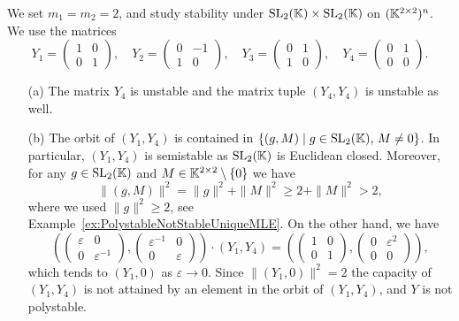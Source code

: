 \begin{example}
	We set $m_1=m_2=2$, and study stability under $\operatorname{SL}_2(\mathbb K) \times \operatorname{SL}_2(\mathbb K)$ on $(\mathbb K^{2 \times 2})^n$. We use the matrices
	\begin{equation*}
		Y_1 = \begin{pmatrix} 1 & 0 \\ 0 & 1 \end{pmatrix}, \quad
		Y_2 = \begin{pmatrix} 0 & -1 \\ 1 & 0 \end{pmatrix}, \quad
		Y_3 = \begin{pmatrix} 0 & 1 \\ 1 & 0 \end{pmatrix}, \quad
		Y_4 = \begin{pmatrix} 0 & 1 \\ 0 & 0 \end{pmatrix}.
	\end{equation*}
	\begin{itemize}
		\item[(a)] The matrix $Y_4$ is unstable and the matrix tuple $(Y_4,Y_4)$ is unstable as well.
		
		\item[(b)] The orbit of $(Y_1,Y_4)$ is contained in $\lbrace (g,M) \mid g \in \operatorname{SL}_2(\mathbb K), \, M \neq 0 \rbrace$. In particular, $(Y_1,Y_4)$ is semistable as $\operatorname{SL}_2(\mathbb K)$ is Euclidean closed. Moreover, for any $g \in \operatorname{SL}_2(\mathbb K)$ and $M \in \mathbb K^{2 \times 2} \setminus \lbrace 0 \rbrace$ we have
		\begin{equation*}
			\| (g,M) \|^2 = \| g \|^2 + \| M \|^2 \geq 2 + \| M \|^2 > 2, 
		\end{equation*}
		where we used $\|g\|^2 \geq 2$, see Example~\ref{ex:PolystableNotStableUniqueMLE}. On the other hand, we have
		\begin{equation*}
			\left( \begin{pmatrix} \varepsilon & 0 \\ 0 & \varepsilon^{-1} \end{pmatrix},
			\begin{pmatrix} \varepsilon^{-1} & 0 \\ 0 & \varepsilon \end{pmatrix} \right) \cdot (Y_1,Y_4) 
			= \left( \begin{pmatrix} 1 & 0 \\ 0 & 1 \end{pmatrix},
			\begin{pmatrix} 0 & \varepsilon^2 \\ 0 & 0 \end{pmatrix}\right),
		\end{equation*}
		which tends to $(Y_1,0)$ as $\varepsilon \to 0$. Since $\| (Y_1,0) \|^2 = 2$ the capacity of $(Y_1,Y_4)$ is not attained by an element in the orbit of $(Y_1,Y_4)$, and $Y$ is not polystable.
		

\end{itemize}
\end{example}
